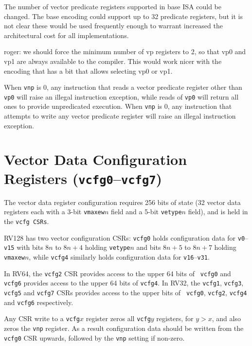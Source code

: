 \begin{discussion}
The number of vector predicate registers supported in
  base ISA could be changed.  The base encoding could support up to 32
  predicate registers, but it is not clear these would be used
  frequently enough to warrant increased the architectural cost for
  all implementations.
  
  roger: we should force the minimum number of vp registers to 2, so that vp0
   and vp1 are always available to the compiler. This would work nicer with
   the encoding that has a bit that allows selecting vp0 or vp1.
\end{discussion}

When {\tt vnp} is 0, any instruction that reads a vector predicate
register other than {\tt vp0} will raise an illegal instruction
exception, while reads of {\tt vp0} will return all ones to provide
unpredicated execution.  When {\tt vnp} is 0, any instruction that
attempts to write any vector predicate register will raise an illegal
instruction exception.

\section{Vector Data Configuration Registers ({\tt vcfg0}--{\tt vcfg7})}

The vector data register configuration requires 256 bits of state (32
vector data registers each with a 3-bit {\tt vmaxew}$n$ field and a
5-bit {\tt vetype}$n$ field), and is held in the {\tt vcfg CSRs}.

RV128 has two vector configuration CSRs: {\tt vcfg0} holds
configuration data for {\tt v0}--{\tt v15} with bits $8n$ to $8n+4$
holding {\tt vetype}$n$ and bits $8n+5$ to $8n+7$ holding {\tt
  vmaxew}$n$, while {\tt vcfg4} similarly holds configuration data
for {\tt v16}--{\tt v31}.

In RV64, the {\tt vcfg2} CSR provides access to the upper 64 bits of {\tt
  vcfg0} and {\tt vcfg6} provides access to the upper 64 bits of
{\tt vcfg4}.  In RV32, the {\tt vcfg1}, {\tt vcfg3}, {\tt vcfg5}
and {\tt vcfg7} CSRs provides access to the upper bits of {\tt
  vcfg0}, {\tt vcfg2}, {\tt vcfg4} and {\tt vcfg6} respectively.

Any CSR write to a {\tt vcfg}$x$ register zeros all {\tt vcfg}$y$
registers, for $y>x$, and also zeros the {\tt vnp} register.  As a
result configuration data should be written from the {\tt vcfg0} CSR
upwards, followed by the {\tt vnp} setting if non-zero.

